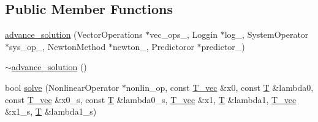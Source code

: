 \subsection*{Public Member Functions}
\begin{DoxyCompactItemize}
\item 
\hyperlink{classcontinuation_1_1advance__solution_a431534d391d29365c19fd7e67bd23459}{advance\-\_\-solution} (Vector\-Operations $\ast$vec\-\_\-ops\-\_\-, Loggin $\ast$log\-\_\-, System\-Operator $\ast$sys\-\_\-op\-\_\-, Newton\-Method $\ast$newton\-\_\-, Predictoror $\ast$predictor\-\_\-)
\item 
\hyperlink{classcontinuation_1_1advance__solution_a81ccd4bfac143b8d6c6a648ba8917f96}{$\sim$advance\-\_\-solution} ()
\item 
bool \hyperlink{classcontinuation_1_1advance__solution_aad61441232f6e12769db1c16214d61cf}{solve} (Nonlinear\-Operator $\ast$nonlin\-\_\-op, const \hyperlink{classcontinuation_1_1advance__solution_a2c54f76f6415c6d28af4c97f7d6fe605}{T\-\_\-vec} \&x0, const \hyperlink{classcontinuation_1_1advance__solution_a525792bcc16846c5ba10f15400d53fed}{T} \&lambda0, const \hyperlink{classcontinuation_1_1advance__solution_a2c54f76f6415c6d28af4c97f7d6fe605}{T\-\_\-vec} \&x0\-\_\-s, const \hyperlink{classcontinuation_1_1advance__solution_a525792bcc16846c5ba10f15400d53fed}{T} \&lambda0\-\_\-s, \hyperlink{classcontinuation_1_1advance__solution_a2c54f76f6415c6d28af4c97f7d6fe605}{T\-\_\-vec} \&x1, \hyperlink{classcontinuation_1_1advance__solution_a525792bcc16846c5ba10f15400d53fed}{T} \&lambda1, \hyperlink{classcontinuation_1_1advance__solution_a2c54f76f6415c6d28af4c97f7d6fe605}{T\-\_\-vec} \&x1\-\_\-s, \hyperlink{classcontinuation_1_1advance__solution_a525792bcc16846c5ba10f15400d53fed}{T} \&lambda1\-\_\-s)
\end{DoxyCompactItemize}


